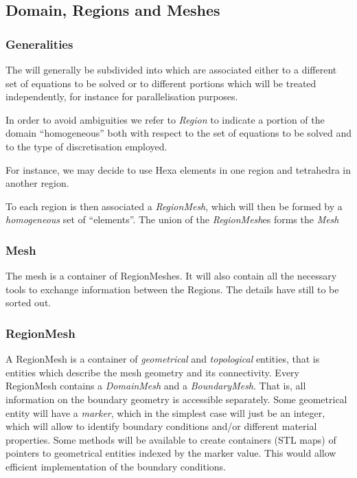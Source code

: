 \subsection{Domain, Regions and Meshes}
\label{sec:doma-regi-mesh}

\subsubsection{Generalities}
\label{sec:generalities}

The \emph{} will generally be subdivided into
\emph{} which are associated either to a different set of
equations to be solved or to different portions which will be treated
independently, for instance for parallelisation purposes.

In order to avoid ambiguities we refer to \emph{Region} to indicate a
portion of the domain ``homogeneous'' both with respect to the set of
equations to be solved and to the type of discretisation employed.

For instance, we may decide to use Hexa elements in one region and
tetrahedra in another region.

To each region is then associated a \emph{RegionMesh}, which will then
be formed by a \emph{homogeneous} set of ``elements''. The union of the
\emph{RegionMesh}es forms the \emph{Mesh}
\subsubsection{Mesh}
The mesh is a container of RegionMeshes. It will also contain all the
necessary tools to exchange information between the Regions. The
details have still to be sorted out.
\subsubsection{RegionMesh}
A RegionMesh is a container of \emph{geometrical} and
\emph{topological} entities, that is entities which describe the mesh
geometry and its connectivity. Every RegionMesh contains a
\emph{DomainMesh} and a \emph{BoundaryMesh}. That is, all information
on the boundary geometry is accessible separately. Some geometrical
entity will have a \emph{marker}, which in the simplest case will just
be an integer, which will allow to identify boundary conditions and/or
different material properties. Some methods will be available to
create containers (STL maps) of pointers to geometrical entities
indexed by the marker value. This would allow efficient implementation
of the boundary conditions.
% 
